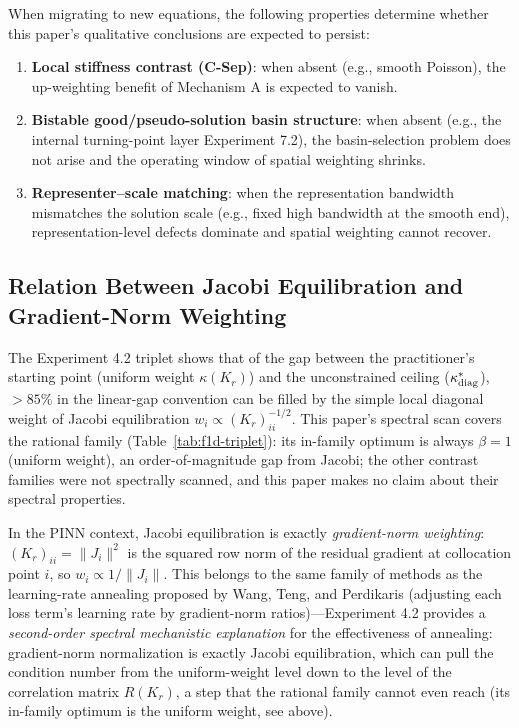 \documentclass[11pt]{article}
\numberwithin{equation}{section}
\begin{document}
When migrating to new equations, the following properties determine whether this paper's qualitative conclusions are expected to persist:
\begin{enumerate}[label=(\arabic*),leftmargin=2em,itemsep=1pt]
\item \textbf{Local stiffness contrast (C-Sep)}: when absent (e.g., smooth Poisson), the up-weighting benefit of Mechanism A is expected to vanish.
\item \textbf{Bistable good/pseudo-solution basin structure}: when absent (e.g., the internal turning-point layer Experiment 7.2), the basin-selection problem does not arise and the operating window of spatial weighting shrinks.
\item \textbf{Representer--scale matching}: when the representation bandwidth mismatches the solution scale (e.g., fixed high bandwidth at the smooth end), representation-level defects dominate and spatial weighting cannot recover.
\end{enumerate}

\subsection{Relation Between Jacobi Equilibration and Gradient-Norm Weighting}\label{sec:jacobi-gap}

The Experiment 4.2 triplet shows that of the gap between the practitioner's starting point (uniform weight $\kappa(K_r)$) and the unconstrained ceiling ($\kappa^*_{\rm diag}$), $>85\%$ in the linear-gap convention can be filled by the simple local diagonal weight of Jacobi equilibration $w_i\propto(K_r)_{ii}^{-1/2}$. This paper's spectral scan covers the rational family (Table~\ref{tab:f1d-triplet}): its in-family optimum is always $\beta=1$ (uniform weight), an order-of-magnitude gap from Jacobi; the other contrast families were not spectrally scanned, and this paper makes no claim about their spectral properties.

In the PINN context, Jacobi equilibration is exactly \emph{gradient-norm weighting}: $(K_r)_{ii}=\|J_i\|^2$ is the squared row norm of the residual gradient at collocation point $i$, so $w_i\propto 1/\|J_i\|$. This belongs to the same family of methods as the learning-rate annealing proposed by Wang, Teng, and Perdikaris \cite{WangTeng2020} (adjusting each loss term's learning rate by gradient-norm ratios)---Experiment 4.2 provides a \emph{second-order spectral mechanistic explanation} for the effectiveness of annealing: gradient-norm normalization is exactly Jacobi equilibration, which can pull the condition number from the uniform-weight level down to the level of the correlation matrix $R(K_r)$, a step that the rational family cannot even reach (its in-family optimum is the uniform weight, see above).
\end{document}
